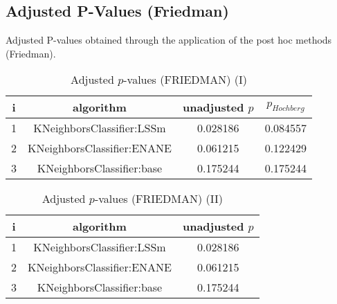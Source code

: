 \documentclass[a4paper,10pt]{article}
\begin{document}
\begin{landscape}
\section{Adjusted P-Values (Friedman)}


Adjusted P-values obtained through the application of the post hoc methods (Friedman).

\begin{table}[!htp]
\centering\small
\begin{tabular}{cccc}
i&algorithm&unadjusted $p$&$p_{Hochberg}$\\
\hline1&KNeighborsClassifier:LSSm&0.028186&0.084557\\2&KNeighborsClassifier:ENANE&0.061215&0.122429\\3&KNeighborsClassifier:base&0.175244&0.175244\\\hline
\end{tabular}
\caption{Adjusted $p$-values (FRIEDMAN) (I)}
\end{table}
\begin{table}[!htp]
\centering\small
\begin{tabular}{ccc}
i&algorithm&unadjusted $p$\\
\hline1&KNeighborsClassifier:LSSm&0.028186\\2&KNeighborsClassifier:ENANE&0.061215\\3&KNeighborsClassifier:base&0.175244\\\hline
\end{tabular}
\caption{Adjusted $p$-values (FRIEDMAN) (II)}
\end{table}

\newpage
\end{landscape}
\end{document}
